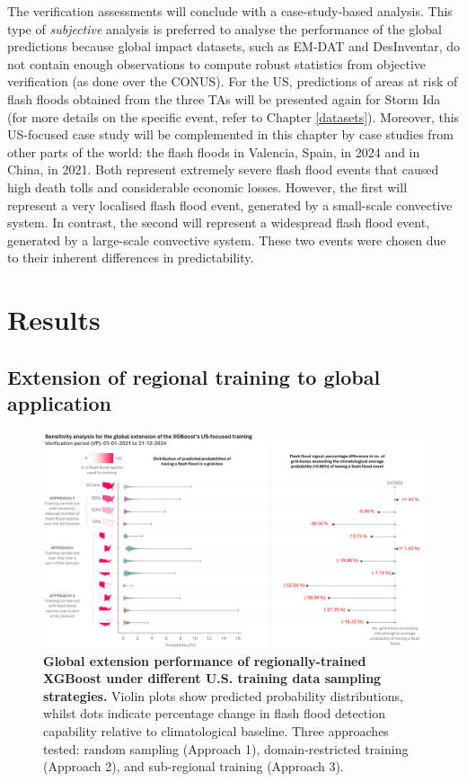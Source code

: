 The verification assessments will conclude with a case-study-based analysis. This type of \textit{subjective} analysis is preferred to analyse the performance of the global predictions because global impact datasets, such as EM-DAT and DesInventar, do not contain enough observations to compute robust statistics from objective verification (as done over the CONUS). For the US, predictions of areas at risk of flash floods obtained from the three TAs will be presented again for Storm Ida (for more details on the specific event, refer to Chapter \ref{datasets}). Moreover, this US-focused case study will be complemented in this chapter by case studies from other parts of the world: the flash floods in Valencia, Spain, in 2024 and in China, in 2021. Both represent extremely severe flash flood events that caused high death tolls and considerable economic losses. However, the first will represent a very localised flash flood event, generated by a small-scale convective system. In contrast, the second will represent a widespread flash flood event, generated by a large-scale convective system. These two events were chosen due to their inherent differences in predictability.


\section{Results}

\subsection{Extension of regional training to global application}

\begin{figure}[htbp]
\centering
\includegraphics[width=\textwidth]{sensitivity_analysis_global_extension.png}
\caption{\textbf{Global extension performance of regionally-trained XGBoost under different U.S. training data sampling strategies.} Violin plots show predicted probability distributions, whilst dots indicate percentage change in flash flood detection capability relative to climatological baseline. Three approaches tested: random sampling (Approach 1), domain-restricted training (Approach 2), and sub-regional training (Approach 3).}
\label{fig:sensitivity_analysis_global_extension}
\end{figure}

